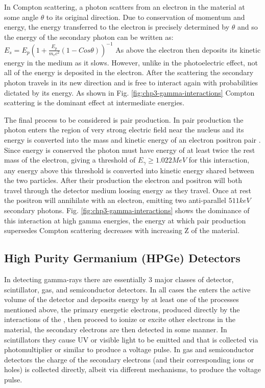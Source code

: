 In Compton scattering, a \gr{} photon scatters from an electron in the material at some angle $\theta$ to its original direction\cite{Compton-PhysRev.21.483}. Due to conservation of momentum and energy, the energy transferred to the electron is precisely determined by $\theta$ and so the energy of the secondary photon can be written as: $E_{s}=E_{p}(1+\frac{E_{p}}{m_{e}c^2}(1-Cos\theta))^{-1}$ As above the electron then deposits its kinetic energy in the medium as it slows. However, unlike in the photoelectric effect, not all of the energy is deposited in the electron. After the scattering the secondary photon travels in its new direction and is free to interact again with probabilities dictated by its energy. As shown in Fig. \ref{fig:chp3-gamma-interactions} Compton scattering is the dominant effect at intermediate energies.

The final process to be considered is pair production. In pair production the photon enters the region of very strong electric field near the nucleus and its energy is converted into the mass and kinetic energy of an electron positron pair \cite{anderson-PhysRev.43.491,oppenheimer_PhysRev.44.53.2}. Since energy is conserved the photon must have energy of at least twice the rest mass of the electron, giving a threshold of $E_{\gamma}\geq1.022MeV$ for this interaction, any energy above this threshold is converted into kinetic energy shared between the two particles. After their production the electron and positron will both travel through the detector medium loosing energy as they travel. Once at rest the positron will annihilate with an electron, emitting two anti-parallel $511keV$ secondary photons. Fig. \ref{fig:chp3-gamma-interactions} shows the dominance of this interaction at high gamma energies, the energy at which pair production supersedes Compton scattering decreases with increasing Z of the material.

\subsection{High Purity Germanium (HPGe) Detectors}
\label{ssec:exp-pr-gamma-spec-hpge}
In detecting gamma-rays there are essentially 3 major classes of detector, scintillator, gas, and semiconductor detectors. In all cases the \gr{} enters the active volume of the detector and deposits energy by at least one of the processes mentioned above, the primary energetic electrons, produced directly by the interactions of the \gr{}, then proceed to ionize or excite other electrons in the material, the secondary electrons are then detected in some manner. In scintillators they cause UV or visible light to be emitted and that is collected via photomultiplier or similar to produce a voltage pulse. In gas and semiconductor detectors the charge of the secondary electrons (and their corresponding ions or holes) is collected directly, albeit via different mechanisms, to produce the voltage pulse.

